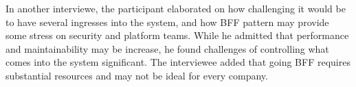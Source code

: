 \documentclass[a4paper,11pt,article,oneside]{memoir}
\begin{document}

In another interviewe, the participant elaborated on how challenging it would be to have several ingresses into the system, and how BFF pattern may provide some stress on security and platform teams. While he admitted that performance and maintainability may be increase, he found challenges of controlling what comes into the system significant. The interviewee added that going BFF requires substantial resources and may not be ideal for every company.





\end{document}
